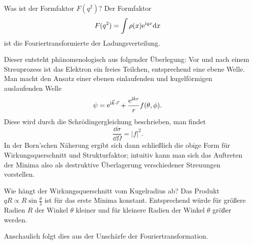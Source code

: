 \begin{fquestion}{Was ist der Formfaktor $F(q^2)$?}
    Der Formfaktor
    $$F(q^2) = \int \rho(x) \text{e}^{\text{i} q x} \dd x$$
    ist die Fouriertransformierte der Ladungsverteilung.
    
    Dieser entsteht phänomenologisch aus folgender Überlegung: Vor und nach einem Streuprozess ist das Elektron ein freies Teilchen, entsprechend eine ebene Welle.
    Man macht den Ansatz einer ebenen einlaufenden und kugelförmigen auslaufenden Welle 
    $$\psi = \text{e}^{ \text{i} \vec{k} \cdot\vec{r} } + \frac{\text{e}^{\text{i} kr}}{r} f(\theta, \phi).$$
    Diese wird durch die Schrödingergleichung beschrieben, man findet 
    $$\frac{\dd \sigma}{\dd \Omega} = |f|^2.$$
    In der Born'schen Näherung ergibt sich dann schließlich die obige Form für Wirkungsquerschnitt und Strukturfaktor; intuitiv kann man sich das Auftreten der Minima also als destruktive Überlagerung verschiedener Streuungen vorstellen.
\end{fquestion}


\begin{fquestion}{Wie hängt der Wirkungsquerschnitt vom Kugelradius ab?}
    Das Produkt $q R \propto R \sin \frac{\theta}{2}$ ist für das erste Minima konstant.
    Entsprechend würde für größere Radien $R$ der Winkel $\theta$ kleiner und für kleinere Radien der Winkel $\theta$ größer werden.
    
    Anschaulich folgt dies aus der Unschärfe der Fouriertransformation.
\end{fquestion}

